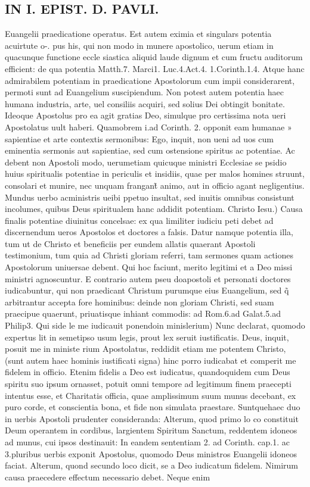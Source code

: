 \documentclass{article}
\begin{document}
\begin{pages}
\section*{IN I. EPIST. D. PAVLI. }
\marginpar{[ p.31 ]}\pstart Euangelii praedicatione operatus. Est autem eximia et singulars potentia acuirtute o-. pus his, qui non modo in munere apostolico, uerum etiam in quacunque  functione eccle siastica aliquid laude dignum et cum fructu auditorum efficient: de qua potentia Matth.7. Marci1. Luc.4.Act.4. 1.Corinth.1.4. Atque  hanc admirabilem potentiam in praedicatione Apostolorum cum impii considerarent, permoti sunt ad Euangelium suscipiendum. Non potest autem potentia haec humana industria, arte, uel consiliis acquiri, sed solius Dei obtingit bonitate. Ideoque  Apostolus pro ea agit gratias Deo, simulque  pro certissima nota ueri Apostolatus uult haberi. Quamobrem i.ad Corinth. 2. opponit eam humanae » sapientiae et arte contextis sermonibus: Ego, inquit, non ueni ad uos cum eminentia   sermonis aut sapientiae, sed cum ostensione spiritus ac potentiae. Ac debent non Apostoli modo, uerumetiam quicuque  ministri Ecclesiae se psidio huius spiritualis potentiae in periculis et insidiis, quae per malos homines struunt, consolari et munire, nec unquam frangant̃ animo, aut in officio agant negligentius. Mundus uerbo acministris ueibi ppetuo insultat, sed inuitis omnibus consistunt incolumes, quibus Deus spiritualem hanc addidit potentiam.  \pend\pstart Christo Iesu.) Causa finalis potentiae diuinitus concelsae: ex qua limiliter iudiciu peti debet ad discernendum ueros Apostolos et doctores a falsis. Datur namque  potentia illa, tum ut de Christo et beneficiis per eundem allatis quaerant Apostoli testimonium, tum quia ad Christi gloriam referri, tam sermones quam actiones Apostolorum uniuersae debent. Qui hoc faciunt, merito legitimi et a Deo missi ministri agnoscuntur. E contrario autem pseu doapostoli et personati doctores iudicabuntur, qui non praedicant Christum purumque  eius Euangelium, sed q̃ arbitrantur accepta fore hominibus: deinde non gloriam Christi, sed suam praecipue quaerunt, priuatisque  inhiant commodis: ad Rom.6.ad Galat.5.ad Philip3.  \pend\pstart Qui side le me iudicauit ponendoin minislerium) Nunc declarat, quomodo expertus lit in semetipso usum legis, prout lex seruit iustificatis. Deus, inquit, posuit me in ministe rium Apostolatus, reddidit etiam me potentem Christo, (sunt autem haec hominis iustificati signa) hinc porro iudicabat et comperit me fidelem in officio. Etenim fidelis a Deo est iudicatus, quandoquidem cum Deus spiritu suo ipsum ornasset, potuit omni tempore ad legitimum finem praecepti intentus esse, et Charitatis officia, quae amplissimum suum munus decebant, ex puro corde, et conscientia bona, et fide non simulata praestare. Suntquehaec duo in uerbis Apostoli prudenter consideranda: Alterum, quod primo lo co constituit Deum operantem in cordibus, largientem Spiritum Sanctum, reddentem idoneos ad munus, cui ipsos destinauit: In eandem sententiam 2. ad Corinth. cap.1. ac 3.pluribus uerbis exponit Apostolus, quomodo Deus ministros Euangelii idoneos faciat. Alterum, quond secundo loco dicit, se a Deo iudicatum fidelem. Nimirum causa praecedere effectum necessario debet. Neque  enim 
\end{pages}
\end{document}
